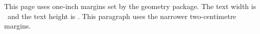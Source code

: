 \documentclass{article}
\begin{document}
This page uses one-inch margins set by the geometry package.
The text width is \the\textwidth\ and the text height is \the\textheight.
This paragraph uses the narrower two-centimetre margins.
\end{document}
